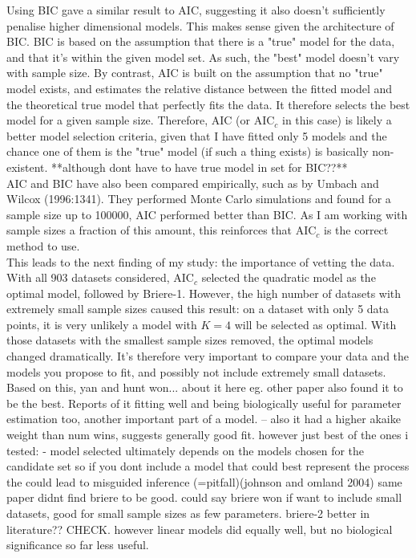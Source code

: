 \documentclass[11pt]{article}
\begin{document}
Using BIC gave a similar result to AIC, suggesting it also doesn't sufficiently penalise higher dimensional models. This makes sense given the architecture of BIC. BIC is based on the assumption that there is a "true" model for the data, and that it's within the given model set. As such, the "best" model doesn't vary with sample size. By contrast, AIC is built on the assumption that no "true" model exists, and estimates the relative distance between the fitted model and the theoretical true model that perfectly fits the data. It therefore selects the best model for a given sample size. Therefore, AIC (or AIC$_c$ in this case) is likely a better model selection criteria, given that I have fitted only 5 models and the chance one of them is the "true" model (if such a thing exists) is basically non-existent. **although dont have to have true model in set for BIC??**
\\

AIC and BIC have also been compared empirically, such as by Umbach and Wilcox (1996:1341). They performed Monte Carlo simulations and found for a sample size up to 100000, AIC performed better than BIC. As I am working with sample sizes a fraction of this amount, this reinforces that AIC$_c$ is the correct method to use.
\\

This leads to the next finding of my study: the importance of vetting the data. With all 903 datasets considered, AIC$_c$ selected the quadratic model as the optimal model, followed by Briere-1. However, the high number of datasets with extremely small sample sizes caused this result: on a dataset with only 5 data points, it is very unlikely a model with $K=4$ will be selected as optimal. With those datasets with the smallest sample sizes removed, the optimal models changed dramatically. It's therefore very important to compare your data and the models you propose to fit, and possibly not include extremely small datasets.
\\

Based on this, yan and hunt won... about it here eg. other paper also found it to be the best. Reports of it fitting well and being biologically useful for parameter estimation too, another important part of a model. -- also it had a higher akaike weight than num wins, suggests generally good fit. however just best of the ones i tested: - model selected ultimately depends on the models chosen for the candidate set so if you dont include a model that could best represent the process the could lead to misguided inference (=pitfall)(johnson and omland 2004)
same paper didnt find briere to be good. could say briere won if want to include small datasets, good for small sample sizes as few parameters. briere-2 better in literature?? CHECK.
 however linear models did equally well, but no biological significance so far less useful.
\end{document}
